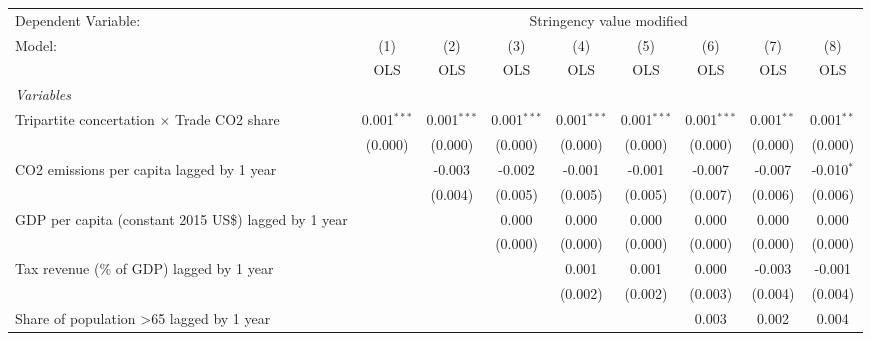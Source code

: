 
\begingroup
\centering
\begin{tabular}{lcccccccc}
   \toprule
   Dependent Variable: & \multicolumn{8}{c}{Stringency value modified}\\
   Model:                                                    & (1)           & (2)           & (3)           & (4)           & (5)           & (6)           & (7)          & (8)\\  
                                                             &  OLS          & OLS           & OLS           & OLS           & OLS           & OLS           & OLS          & OLS\\  
   \midrule
   \emph{Variables}\\
   Tripartite concertation $\times$ Trade CO2 share          & 0.001$^{***}$ & 0.001$^{***}$ & 0.001$^{***}$ & 0.001$^{***}$ & 0.001$^{***}$ & 0.001$^{***}$ & 0.001$^{**}$ & 0.001$^{**}$\\   
                                                             & (0.000)       & (0.000)       & (0.000)       & (0.000)       & (0.000)       & (0.000)       & (0.000)      & (0.000)\\   
   CO2 emissions per capita lagged by 1 year                 &               & -0.003        & -0.002        & -0.001        & -0.001        & -0.007        & -0.007       & -0.010$^{*}$\\   
                                                             &               & (0.004)       & (0.005)       & (0.005)       & (0.005)       & (0.007)       & (0.006)      & (0.006)\\   
   GDP per capita (constant 2015 US\$) lagged by 1 year      &               &               & 0.000         & 0.000         & 0.000         & 0.000         & 0.000        & 0.000\\   
                                                             &               &               & (0.000)       & (0.000)       & (0.000)       & (0.000)       & (0.000)      & (0.000)\\   
   Tax revenue (\% of GDP) lagged by 1 year                  &               &               &               & 0.001         & 0.001         & 0.000         & -0.003       & -0.001\\   
                                                             &               &               &               & (0.002)       & (0.002)       & (0.003)       & (0.004)      & (0.004)\\   
   Share of population >65 lagged by 1 year                  &               &               &               &               &               & 0.003         & 0.002        & 0.004\\   

\end{tabular}
